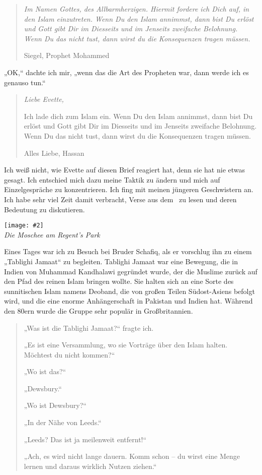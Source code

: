 \documentclass[12pt]{memoir}
\newcommand{\img}[3]{\begin{center}%
\texttt{[image: \#2]}\\{\small\em#3}%
\end{center}}
\begin{document}
\begin{quote}
\em
Im Namen Gottes, des Allbarmherzigen.
Hiermit fordere ich Dich auf, in den Islam einzutreten.
Wenn Du den Islam annimmst, dann bist Du erlöst
und Gott gibt Dir im Diesseits und im Jenseits zweifache Belohnung.
Wenn Du das nicht tust, dann wirst du die Konsequenzen tragen müssen.

Siegel, Prophet Mohammed
\end{quote}

„OK,“ dachte ich mir, „wenn das die Art des Propheten war,
dann werde ich es genauso tun.“

\begin{quote}
\em
Liebe Evette,

Ich lade dich zum Islam ein.
Wenn Du den Islam annimmst,
dann bist Du erlöst und Gott gibt Dir im Diesseits
und im Jenseits zweifache Belohnung.
Wenn Du das nicht tust, dann wirst du die Konsequenzen tragen müssen.

Alles Liebe,
Hassan
\end{quote}

Ich weiß nicht, wie Evette auf diesen Brief reagiert hat,
denn sie hat nie etwas gesagt.
Ich entschied mich dazu meine Taktik zu ändern
und mich auf Einzelgespräche zu konzentrieren.
Ich fing mit meinen jüngeren Geschwistern an.
Ich habe sehr viel Zeit damit verbracht,
Verse aus dem \Quran\ zu lesen und deren Bedeutung zu diskutieren.

\img{scale=0.4}{Hassan_in_Regents_Park_Mosque.jpg}
{Die Moschee am Regent’s Park}

Eines Tages war ich zu Besuch bei Bruder Schafiq,
als er vorschlug ihn zu einem „Tablighi Jamaat“ zu begleiten.
Tablighi Jamaat war eine Bewegung,
die in Indien von Muhammad Kandhalawi gegründet wurde,
der die Muslime zurück auf den Pfad des reinen Islam bringen wollte.
Sie halten sich an eine Sorte des sunnitischen Islam namens Deoband,
die von großen Teilen Südost-Asiens befolgt wird,
und die eine enorme Anhängerschaft in Pakistan und Indien hat.
Während den 80ern wurde die Gruppe sehr populär in Großbritannien.

\begin{quote}
„Was ist die Tablighi Jamaat?“ fragte ich.

„Es ist eine Versammlung, wo sie Vorträge über den Islam halten.
Möchtest du nicht kommen?“

„Wo ist das?“

„Dewsbury.“

„Wo ist Dewsbury?“

„In der Nähe von Leeds.“

„Leeds? Das ist ja meilenweit entfernt!“

„Ach, es wird nicht lange dauern. Komm schon –
du wirst eine Menge lernen und daraus wirklich Nutzen ziehen.“
\end{quote}
\end{document}
